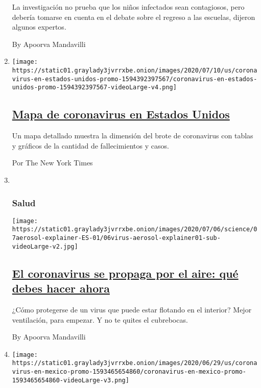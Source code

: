 \begin{enumerate}
  La investigación no prueba que los niños infectados sean contagiosos,
  pero debería tomarse en cuenta en el debate sobre el regreso a las
  escuelas, dijeron algunos expertos.

  By Apoorva Mandavilli
\item
  \texttt{[image: https://static01.graylady3jvrrxbe.onion/images/2020/07/10/us/coronavirus-en-estados-unidos-promo-1594392397567/coronavirus-en-estados-unidos-promo-1594392397567-videoLarge-v4.png]}

  \hypertarget{mapa-de-coronavirus-en-estados-unidos}{%
  \subsection{\texorpdfstring{\href{/es/interactive/2020/espanol/mundo/coronavirus-en-estados-unidos.html}{Mapa
  de coronavirus en Estados
  Unidos}}{Mapa de coronavirus en Estados Unidos}}\label{mapa-de-coronavirus-en-estados-unidos}}

  Un mapa detallado muestra la dimensión del brote de coronavirus con
  tablas y gráficos de la cantidad de fallecimientos y casos.

  Por The New York Times
\item ~
  \hypertarget{salud}{%
  \subsubsection{Salud}\label{salud}}

  \texttt{[image: https://static01.graylady3jvrrxbe.onion/images/2020/07/06/science/07aerosol-explainer-ES-01/06virus-aerosol-explainer01-sub-videoLarge-v2.jpg]}

  \hypertarget{el-coronavirus-se-propaga-por-el-aire-quuxe9-debes-hacer-ahora}{%
  \subsection{\texorpdfstring{\href{/es/2020/07/08/espanol/ciencia-y-tecnologia/coronavirus-aire-aerosoles.html}{El
  coronavirus se propaga por el aire: qué debes hacer
  ahora}}{El coronavirus se propaga por el aire: qué debes hacer ahora}}\label{el-coronavirus-se-propaga-por-el-aire-quuxe9-debes-hacer-ahora}}

  ¿Cómo protegerse de un virus que puede estar flotando en el interior?
  Mejor ventilación, para empezar. Y no te quites el cubrebocas.

  By Apoorva Mandavilli
\item
  \texttt{[image: https://static01.graylady3jvrrxbe.onion/images/2020/06/29/us/coronavirus-en-mexico-promo-1593465654860/coronavirus-en-mexico-promo-1593465654860-videoLarge-v3.png]}


\end{enumerate}
